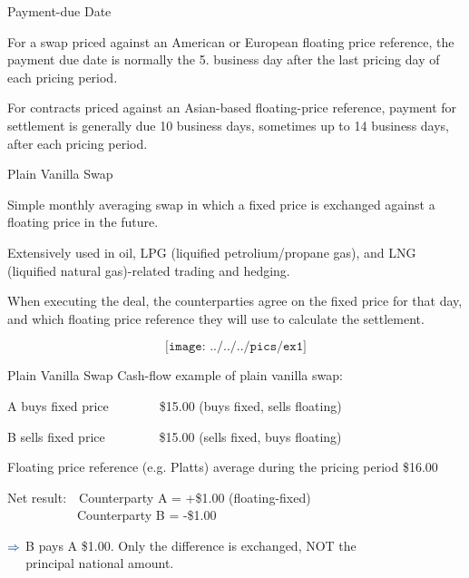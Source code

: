 {Payment-due Date}
\item<1-> For a swap priced against an American or European floating price reference, the payment due date is normally the 5. business day after the last pricing day of each pricing period.
\item<2->
For contracts priced against an Asian-based floating-price reference, payment for settlement is generally due 10 business days, sometimes up to 14 business days, after each pricing period.


{Plain Vanilla Swap}
  \item<1-> Simple monthly averaging swap in which a fixed price is exchanged against a floating price in the future.
  \item<2-> Extensively used in oil, LPG (liquified petrolium/propane gas), and LNG (liquified natural gas)-related trading and hedging.
  \item<3-> When executing the deal, the counterparties agree on the fixed price for that day, and which floating price reference they will use to calculate the settlement.
      \item<4->
$$\texttt{[image: ../../../pics/ex1]}$$

{Plain Vanilla Swap}
\textcolor[rgb]{0.00,0.25,0.50}{Cash-flow example of plain vanilla swap:}\\
\item<1->
A buys fixed price$\qquad\qquad$\$15.00 (buys fixed, sells floating)
\item<2-> B sells fixed price$\qquad\qquad\;$\$15.00 (sells fixed, buys floating)
\item<3->
Floating price reference (e.g. Platts) average during the pricing period \$16.00
\item<4->
\vspace{0.3cm}
\textcolor[rgb]{0.00,0.25,0.50}{Net result:}$\quad$Counterparty A = +\$1.00 (floating-fixed)\\
$\qquad\qquad\quad\,$  Counterparty B = -\$1.00
\item<5->
$\textcolor[rgb]{0.00,0.25,0.50}{\Rightarrow}$ B pays A \$1.00. Only the difference is exchanged, NOT the \\
$\quad\;\,$principal national amount.


